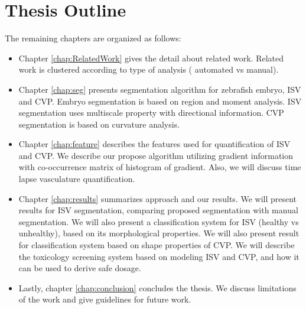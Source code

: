 \section{Thesis Outline}
The remaining chapters are organized as follows:

\begin{itemize}

\item Chapter \ref{chap:RelatedWork} gives the detail about related work. Related work is clustered according to type of analysis ( automated vs manual).

\item Chapter \ref{chap:seg} presents segmentation algorithm for zebrafish embryo, ISV and CVP. Embryo segmentation is based on region and moment analysis. ISV segmentation uses multiscale property with directional information. CVP segmentation is based on curvature analysis.
 
\item Chapter \ref{chap:feature} describes the features used for quantification of ISV and CVP. We describe our propose algorithm utilizing gradient information with co-occurrence matrix of histogram of gradient. Also, we will discuss time lapse vasculature quantification. 

\item Chapter \ref{chap:results} summarizes approach and our results. We will present results for ISV segmentation, comparing proposed segmentation with manual segmentation. We will also present a classification system for ISV (healthy vs unhealthy), based on its morphological properties. We will also present result for classification system  based on shape properties of CVP. We will describe the toxicology screening system based on modeling ISV and CVP, and how it can be used to derive safe dosage.

\item Lastly, chapter \ref{chap:conclusion} concludes the thesis. We discuss limitations of the work and give guidelines for future work.

\end{itemize}
